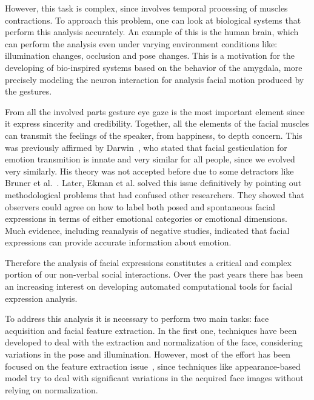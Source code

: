 However, this task is complex, since involves temporal processing of muscles contractions. To approach this problem, one can look at biological systems that perform this analysis accurately. An example of this is the human brain, which can perform the analysis even under varying environment conditions like: illumination changes, occlusion and pose changes. This is a motivation for the developing of bio-inspired systems based on the behavior of the amygdala, more precisely modeling the neuron interaction for analysis facial motion produced by the gestures.

From all the involved parts gesture eye gaze is the most important element since it express sincerity and credibility. Together, all the elements of the facial muscles can transmit the feelings of the speaker, from happiness, to depth concern. This was previously affirmed by Darwin~\cite{Darwin1872}, who stated that facial gesticulation for emotion transmition is innate and very similar for all people, since we evolved very similarly. His theory was not accepted before due to some detractors like Bruner et al.~\cite{Bruner1954}. Later, Ekman et al. \cite{Hager1979} solved this issue definitively by pointing out methodological problems that had confused other researchers. They showed that observers could agree on how to label both posed and spontaneous facial expressions in terms of either emotional categories or emotional dimensions. Much evidence, including reanalysis of negative studies, indicated that facial expressions can provide accurate information about emotion.

Therefore the analysis of facial expressions constitutes a critical and complex portion of our non-verbal social interactions. Over the past years there has been an increasing interest on developing automated computational tools for facial expression analysis.

To address this analysis it is necessary to perform two main tasks: face acquisition and facial feature extraction. In the first one, techniques have been developed to deal with the extraction and normalization of the face, considering variations in the pose and illumination. However, most of the effort has been focused on the feature extraction issue~\cite{Fasel2003}, since techniques like appearance-based model try to deal with significant variations in the acquired face images without relying on normalization.

